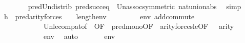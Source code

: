 \begin{isabellebody}
\ \ \ \ \ \ \isamarkupfalse%
\ pred{\isacharunderscore}{\kern0pt}Un{\isacharunderscore}{\kern0pt}distrib\ pred{\isacharunderscore}{\kern0pt}succ{\isacharunderscore}{\kern0pt}eq\ {\isacartoucheopen}{\isasymphi}{\isasymin}{\isacharunderscore}{\kern0pt}{\isacartoucheclose}\ Un{\isacharunderscore}{\kern0pt}assoc{\isacharbrackleft}{\kern0pt}symmetric{\isacharbrackright}{\kern0pt}\ nat{\isacharunderscore}{\kern0pt}union{\isacharunderscore}{\kern0pt}abs{}\ \isamarkupfalse%
\ simp\isanewline
\ \ \ \ \isamarkupfalse%
\ h{\isacharcolon}{\kern0pt}{\isachardoublequoteopen}{}\ {\isasymunion}\ pred{\isacharparenleft}{\kern0pt}arity{\isacharparenleft}{\kern0pt}forces{\isacharparenleft}{\kern0pt}{\isasymphi}{\isacharparenright}{\kern0pt}{\isacharparenright}{\kern0pt}{\isacharparenright}{\kern0pt}\ {\isasymle}\ {}\ {\isasymunion}\ {\isacharparenleft}{\kern0pt}{}{\isacharhash}{\kern0pt}{\isacharplus}{\kern0pt}length{\isacharparenleft}{\kern0pt}env{\isacharparenright}{\kern0pt}{\isacharparenright}{\kern0pt}{\isachardoublequoteclose}\isanewline
\ \ \ \ \ \ \isamarkupfalse%
\ \ {\isacartoucheopen}env{\isasymin}{\isacharunderscore}{\kern0pt}{\isacartoucheclose}\ add{\isacharunderscore}{\kern0pt}commute\ {\isacartoucheopen}{\isasymphi}{\isasymin}{\isacharunderscore}{\kern0pt}{\isacartoucheclose}\isanewline
\ \ \ \ \ \ \ \ \ \ \ \ Un{\isacharunderscore}{\kern0pt}le{\isacharunderscore}{\kern0pt}compat{\isacharbrackleft}{\kern0pt}of\ {}\ {}{\isacharcomma}{\kern0pt}OF\ {\isacharunderscore}{\kern0pt}\ pred{\isacharunderscore}{\kern0pt}mono{\isacharbrackleft}{\kern0pt}OF\ {\isacharunderscore}{\kern0pt}\ arity{\isacharunderscore}{\kern0pt}forces{\isacharunderscore}{\kern0pt}le{\isacharbrackleft}{\kern0pt}OF\ {\isacharunderscore}{\kern0pt}\ {\isacharunderscore}{\kern0pt}\ {\isacartoucheopen}arity{\isacharparenleft}{\kern0pt}{\isasymphi}{\isacharparenright}{\kern0pt}{\isasymle}{\isacharunderscore}{\kern0pt}{\isacartoucheclose}{\isacharbrackright}{\kern0pt}{\isacharbrackright}{\kern0pt}\ {\isacharbrackright}{\kern0pt}\isanewline
\ \ \ \ \ \ \ \ \ \ \ \ {\isacartoucheopen}env{\isasymin}{\isacharunderscore}{\kern0pt}{\isacartoucheclose}\ \isamarkupfalse%
\ auto\isanewline
\ \ \ \ \isamarkupfalse%
\ {\isacartoucheopen}{\isasymphi}{\isasymin}{\isacharunderscore}{\kern0pt}{\isacartoucheclose}\ {\isacartoucheopen}env{\isasymin}{\isacharunderscore}{\kern0pt}{\isacartoucheclose}\isanewline
\ \ \ \ \isamarkupfalse%

\end{isabellebody}
